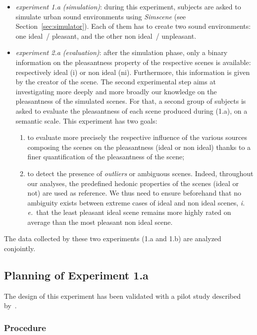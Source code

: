 \documentclass[12pt]{elsarticle}
\newcommand{\ie}{\emph{i.\,e.}}
\begin{document}
\begin{itemize}
\item \emph{experiment 1.a (simulation)}: during this experiment, subjects are asked to simulate urban sound environments using \emph{Simscene} (see Section~\ref{sec:simulator}). Each of them has to create two sound environments: one ideal~/ pleasant, and the other non ideal~/ unpleasant.
\item \emph{experiment 2.a (evaluation)}: after the simulation phase, only a binary information on the pleasantness property of the respective scenes is available: respectively ideal (i) or non ideal (ni). Furthermore, this information is given by the creator of the scene. The second experimental step aims at investigating more deeply and more broadly our knowledge on the pleasantness of the simulated scenes. For that, a second group of subjects is asked to evaluate the pleasantness of each scene produced during (1.a), on a semantic scale. This experiment has two goals:
\begin{enumerate}
\item to evaluate more precisely the respective influence of the various sources composing the scenes on the pleasantness  (ideal or non ideal) thanks to a finer quantification of the pleasantness of the scene;
\item to detect the presence of \emph{outliers} or ambiguous scenes. Indeed, throughout our analyses, the predefined hedonic properties of the scenes (ideal or not) are used as reference. We thus need to ensure beforehand that no ambiguity exists between extreme cases of ideal and non ideal scenes, \ie~that the least pleasant ideal scene remains more highly rated on average than the most pleasant non ideal scene.
\end{enumerate}
\end{itemize}


The data collected by these two experiments (1.a and 1.b) are analyzed conjointly.

\subsection{Planning of Experiment 1.a}
\label{sec:xp1a_plan}

The design of this experiment has been validated with a pilot study described by~\cite{lafay2014new}.

\subsubsection*{Procedure}
\end{document}
